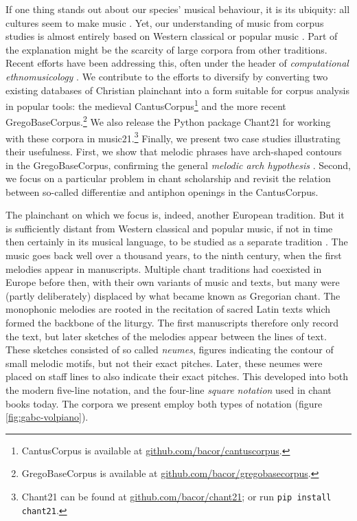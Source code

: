 \documentclass[sigconf,screen]{acmart}
\begin{document}
If one thing stands out about our species' musical behaviour, it is its ubiquity: all cultures seem to make music \cite{Mehr2019}. 
Yet, our understanding of music from corpus studies is almost entirely based on Western classical or popular music \cite{Savage2018a}.
Part of the explanation might be the scarcity of large corpora from other traditions.
Recent efforts have been addressing this, often under the header of \emph{computational ethnomusicology} \cite{Tzanetakis2007}.
We contribute to the efforts to diversify by converting two existing databases of Christian plainchant into a form suitable for corpus analysis in popular tools: the medieval CantusCorpus\footnote{%
    CantusCorpus is available at
    \href{https://github.com/bacor/cantuscorpus}{github.com/bacor/cantuscorpus}.}
and the more recent GregoBaseCorpus.\footnote{%
    GregoBaseCorpus is available at
    \href{https://github.com/bacor/gregobasecorpus}{github.com/bacor/gregobasecorpus}.}
We also release the Python package Chant21 for working with these corpora in music21.\footnote{%
    Chant21 can be found at \href{https://github.com/bacor/chant21}{github.com/bacor/chant21}; or run \texttt{pip install chant21}.}
Finally, we present two case studies illustrating their usefulness.
First, we show that melodic phrases have arch-shaped contours in the GregoBaseCorpus, confirming the general \emph{melodic arch hypothesis} \cite{Huron1996}.
Second, we focus on a particular problem in chant scholarship and revisit the relation between so-called differentiæ and antiphon openings \cite{Shaw2018} in the CantusCorpus. 


The plainchant on which we focus is, indeed, another European tradition.
But it is sufficiently distant from Western classical and popular music, if not in time then certainly in its musical language, to be studied as a separate tradition \cite{Jeffery1992}.
The music goes back well over a thousand years, to the ninth century, when the first melodies appear in manuscripts.
Multiple chant traditions had coexisted in Europe before then, with their own variants of music and texts, but many were (partly deliberately) displaced by what became known as Gregorian chant.
The monophonic melodies are rooted in the recitation of sacred Latin texts which formed the backbone of the liturgy.
The first manuscripts therefore only record the text, but later sketches of the melodies appear between the lines of text.
These sketches consisted of so called \emph{neumes}, figures indicating the contour of small melodic motifs, but not their exact pitches. 
Later, these neumes were placed on staff lines to also indicate  their exact pitches.
This developed into both the modern five-line notation, and the four-line \emph{square notation} used in chant books today.
The corpora we present employ both types of notation  (figure \ref{fig:gabc-volpiano}).
\end{document}
